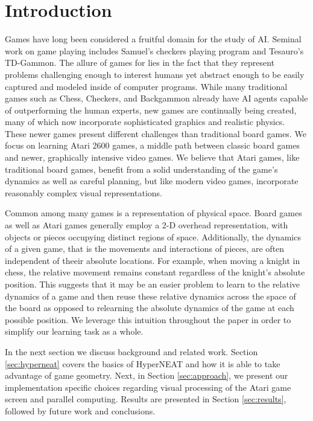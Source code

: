 \documentclass{acm_proc_article-sp}
\begin{document}
\section{Introduction}
Games have long been considered a fruitful domain for the study of AI. Seminal work on game playing includes Samuel's checkers playing program\cite{samuel_59} and Tesauro's TD-Gammon\cite{tesauro_94}. The allure of games for lies in the fact that they represent problems challenging enough to interest humans yet abstract enough to be easily captured and modeled inside of computer programs. While many traditional games such as Chess, Checkers, and Backgammon already have AI agents capable of outperforming the human experts, new games are continually being created, many of which now incorporate sophisticated graphics and realistic physics. These newer games present different challenges than traditional board games. We focus on learning Atari 2600 games, a middle path between classic board games and newer, graphically intensive video games. We believe that Atari games, like traditional board games, benefit from a solid understanding of the game's dynamics as well as careful planning, but like modern video games, incorporate reasonably complex visual representations.

Common among many games is a representation of physical space. Board games as well as Atari games generally employ a 2-D overhead representation, with objects or pieces occupying distinct regions of space. Additionally, the dynamics of a given game, that is the movements and interactions of pieces, are often independent of theeir absolute locations. For example, when moving a knight in chess, the relative movement remains constant regardless of the knight's absolute position. This suggests that it may be an easier problem to learn to the relative dynamics of a game and then reuse these relative dynamics across the space of the board as opposed to relearning the absolute dynamics of the game at each possible position. We leverage this intuition throughout the paper in order to simplify our learning task as a whole.


In the next section we discuss background and related work. Section \ref{sec:hyperneat} covers the basics of HyperNEAT and how it is able to take advantage of game geometry. Next, in Section \ref{sec:approach}, we present our implementation specific choices regarding visual processing of the Atari game screen and parallel computing. Results are presented in Section \ref{sec:results}, followed by future work and conclusions.
\end{document}
